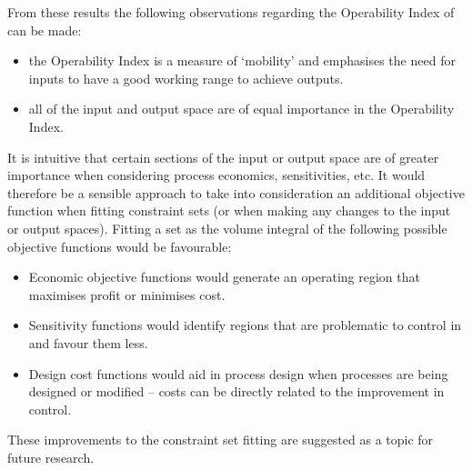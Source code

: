 From these results the following observations regarding the Operability Index of \citet{vinsonphd} can be made:
\begin{itemize}
\item the Operability Index is a measure of `mobility' and emphasises the need for inputs to have a good working range to achieve outputs.
\item all of the input and output space are of equal importance in the Operability Index.
\end{itemize}

It is intuitive that certain sections of the input or output space are of greater importance when considering process economics, sensitivities, etc.
It would therefore be a sensible approach to take into consideration an additional objective function when fitting constraint sets (or when making any changes to the input or output spaces).
Fitting a set as the volume integral of the following possible objective functions would be favourable:
\begin{itemize}
\item Economic objective functions would generate an operating region that maximises profit or minimises cost.
\item Sensitivity functions would identify regions that are problematic to control in and favour them less.
\item Design cost functions would aid in process design when processes are being designed or modified -- costs can be directly related to the improvement in control.
\end{itemize}
These improvements to the constraint set fitting are suggested as a topic for future research.

